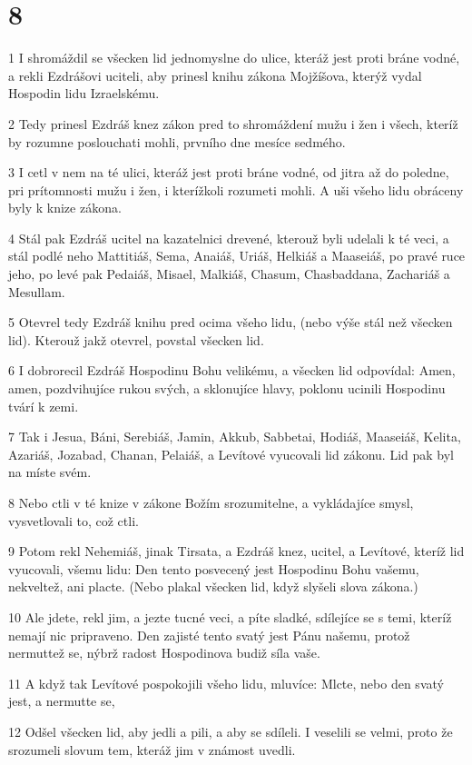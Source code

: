 \chapter{8}

\par 1 I shromáždil se všecken lid jednomyslne do ulice, kteráž jest proti bráne vodné, a rekli Ezdrášovi uciteli, aby prinesl knihu zákona Mojžíšova, kterýž vydal Hospodin lidu Izraelskému.
\par 2 Tedy prinesl Ezdráš knez zákon pred to shromáždení mužu i žen i všech, kteríž by rozumne poslouchati mohli, prvního dne mesíce sedmého.
\par 3 I cetl v nem na té ulici, kteráž jest proti bráne vodné, od jitra až do poledne, pri prítomnosti mužu i žen, i kterížkoli rozumeti mohli. A uši všeho lidu obráceny byly k knize zákona.
\par 4 Stál pak Ezdráš ucitel na kazatelnici drevené, kterouž byli udelali k té veci, a stál podlé neho Mattitiáš, Sema, Anaiáš, Uriáš, Helkiáš a Maaseiáš, po pravé ruce jeho, po levé pak Pedaiáš, Misael, Malkiáš, Chasum, Chasbaddana, Zachariáš a Mesullam.
\par 5 Otevrel tedy Ezdráš knihu pred ocima všeho lidu, (nebo výše stál než všecken lid). Kterouž jakž otevrel, povstal všecken lid.
\par 6 I dobrorecil Ezdráš Hospodinu Bohu velikému, a všecken lid odpovídal: Amen, amen, pozdvihujíce rukou svých, a sklonujíce hlavy, poklonu ucinili Hospodinu tvárí k zemi.
\par 7 Tak i Jesua, Báni, Serebiáš, Jamin, Akkub, Sabbetai, Hodiáš, Maaseiáš, Kelita, Azariáš, Jozabad, Chanan, Pelaiáš, a Levítové vyucovali lid zákonu. Lid pak byl na míste svém.
\par 8 Nebo ctli v té knize v zákone Božím srozumitelne, a vykládajíce smysl, vysvetlovali to, což ctli.
\par 9 Potom rekl Nehemiáš, jinak Tirsata, a Ezdráš knez, ucitel, a Levítové, kteríž lid vyucovali, všemu lidu: Den tento posvecený jest Hospodinu Bohu vašemu, nekveltež, ani placte. (Nebo plakal všecken lid, když slyšeli slova zákona.)
\par 10 Ale jdete, rekl jim, a jezte tucné veci, a píte sladké, sdílejíce se s temi, kteríž nemají nic pripraveno. Den zajisté tento svatý jest Pánu našemu, protož nermuttež se, nýbrž radost Hospodinova budiž síla vaše.
\par 11 A když tak Levítové pospokojili všeho lidu, mluvíce: Mlcte, nebo den svatý jest, a nermutte se,
\par 12 Odšel všecken lid, aby jedli a pili, a aby se sdíleli. I veselili se velmi, proto že srozumeli slovum tem, kteráž jim v známost uvedli.
